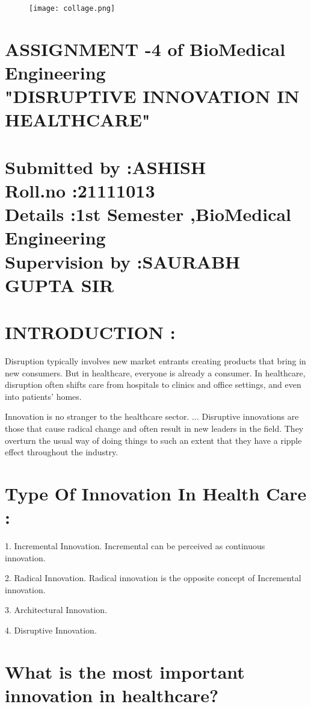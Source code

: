 \documentclass[12pt]{article}
\begin{document}
\begin{figure}

\centering
\texttt{[image: collage.png]}

\end{figure}

\section*{ASSIGNMENT -4 of BioMedical Engineering\\"DISRUPTIVE INNOVATION IN HEALTHCARE"\\\\Submitted by :ASHISH\\Roll.no :21111013\\Details :1st Semester ,BioMedical Engineering\\Supervision by :SAURABH GUPTA SIR}

\clearpage 
\section*{INTRODUCTION :}
Disruption typically involves new market entrants creating products that bring in new consumers. But in healthcare, everyone is already a consumer. In healthcare, disruption often shifts care from hospitals to clinics and office settings, and even into patients' homes. 


Innovation is no stranger to the healthcare sector. ... Disruptive innovations are those that cause radical change and often result in new leaders in the field. They overturn the usual way of doing things to such an extent that they have a ripple effect throughout the industry.

\section*{Type Of Innovation In Health Care :}
 1. Incremental Innovation. Incremental can be perceived as continuous innovation. 
 
 
 2. Radical Innovation. Radical innovation is the opposite concept of Incremental innovation. 
 
 
 3.  Architectural Innovation. 
 
 
 4. Disruptive Innovation.
 
\section*{What is the most important innovation in healthcare?}
\end{document}
